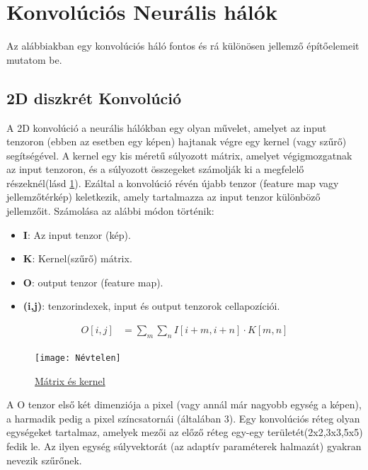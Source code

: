 \documentclass[12pt,oneside,a4paper]{article}
\theoremstyle{remark}
\begin{document}
\section{Konvolúciós Neurális hálók}\label{sec:konvolucios-neuralis-halok}
Az alábbiakban egy konvolúciós háló fontos és rá különösen jellemző építőelemeit mutatom be.

\subsection{2D diszkrét Konvolúció}\label{subsec:2d-diszkret-konvolucio}

A 2D konvolúció a neurális hálókban egy olyan művelet, amelyet az input tenzoron (ebben az esetben egy képen) hajtanak
végre egy kernel (vagy szűrő) segítségével.
A kernel egy kis méretű súlyozott mátrix, amelyet végigmozgatnak az input tenzoron,
és a súlyozott összegeket számolják ki a megfelelő részeknél(lásd \ref{fig:Konvolucio}).
Ezáltal a konvolúció révén újabb tenzor (feature map vagy jellemzőtérkép) keletkezik, amely tartalmazza az input
tenzor különböző jellemzőit.
Számolása az alábbi módon történik:

\begin{itemize}
\item \textbf{I}: Az input tenzor (kép).
\item \textbf{K}: Kernel(szűrő) mátrix.
\item \textbf{O}: output tenzor (feature map).
\item \textbf{(i,j)}: tenzorindexek, input és output tenzorok cellapozíciói.
\end{itemize}
\vspace{3mm}
\begin{align}
O[i,j] &= \displaystyle\sum_{m} \sum_{n} I[i+m, i+n] \cdot K[m, n]
\end{align}
\begin{figure}[ht]
\centering
\texttt{[image: Névtelen]}
\caption{\label{fig:Konvolucio}
\href{https://towardsdatascience.com/intuitively-understanding-convolutions-for-deep-learning-1f6f42faee1}{Mátrix és kernel}}
\end{figure}
\vspace{3mm}
\noindent A O tenzor első két dimenziója a pixel (vagy annál már nagyobb egység a képen), a harmadik pedig a pixel
színcsatornái (általában 3).
Egy konvolúciós réteg olyan egységeket tartalmaz, amelyek mezői az előző réteg egy-egy területét(2x2,3x3,5x5) fedik le.
Az ilyen egység súlyvektorát (az adaptív paraméterek halmazát) gyakran nevezik szűrőnek.
\end{document}
